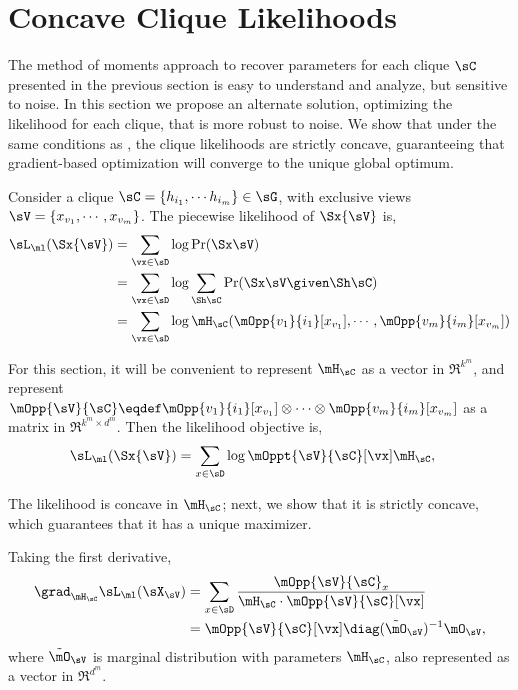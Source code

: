 \section{Concave Clique Likelihoods}
\label{sec:piecewise}

The method of moments approach to recover parameters for each clique
  $\sC$ presented in the previous section is easy to understand and
  analyze, but sensitive to noise. 
In this section we propose an alternate solution, optimizing the 
  likelihood for each clique, that is more robust to noise.
We show that under the same conditions as , the
  clique likelihoods are strictly concave, guaranteeing that
  gradient-based optimization will converge to the unique global
  optimum.

Consider a clique $\sC = \{h_{i_1}, \cdots h_{i_m}\} \in \sG$, with
  exclusive views $\sV = \{x_{v_1}, \cdots, x_{v_m}\}$. 
The piecewise likelihood of $\Sx{\sV}$ is,
\begin{align*}
  \sL_\ml(\Sx{\sV}) 
   &= \sum_{\vx \in \sD} \log \Pr( \Sx \sV ) \\
   &= \sum_{\vx \in \sD} \log \sum_{\Sh \sC} \Pr( \Sx \sV \given \Sh \sC ) \\
   &= \sum_{\vx \in \sD} \log \mH_\sC(\mOpp{v_1}{i_1} [x_{v_1}], \cdots, \mOpp{v_m}{i_m} [x_{v_m}])
\end{align*}

For this section, it will be convenient to represent $\mH_\sC$ as
  a vector in $\Re^{k^m}$, and represent $\mOpp{\sV}{\sC} \eqdef
  \mOpp{v_1}{i_1} [x_{v_1}] \otimes \cdots \otimes
  \mOpp{v_m}{i_m} [x_{v_m}]$ as a matrix in $\Re^{k^m \times
  d^m}$.
Then the likelihood objective is,
\begin{align*}
  \sL_\ml(\Sx{\sV}) 
   &= \sum_{x \in \sD} \log \mOppt{\sV}{\sC}[\vx] \mH_\sC,
\end{align*}

The likelihood is concave in $\mH_\sC$; next, we show that it is
strictly concave, which guarantees that it has a unique maximizer.
  
Taking the first derivative,
\begin{align}
  \grad_{\mH_\sC} \sL_\ml(\sX_\sV) 
  &= \sum_{x \in \sD} \frac{\mOpp{\sV}{\sC}_x}{\mH_\sC \cdot \mOpp{\sV}{\sC}[\vx]} \nonumber \\ 
  &= \mOpp{\sV}{\sC}[\vx] \diag(\tilde \mO_{\sV})^{-1} \mO_{\sV}, \label{eqn:lhood-grad}
\end{align}
where $\tilde \mO_\sV$ is marginal distribution with parameters $\mH_\sC$, also represented as a vector in $\Re^{d^m}$.

